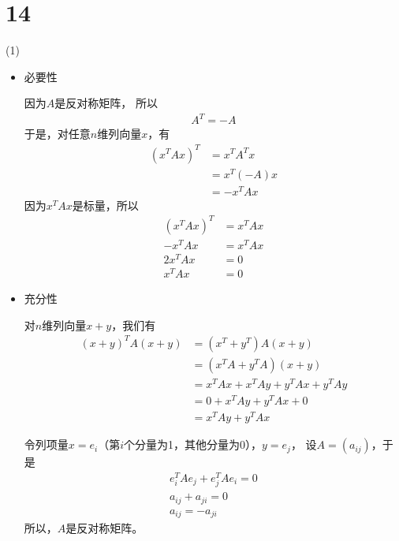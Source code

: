 \documentclass{article}
\begin{document}
\section*{14}

 (1)
\begin{itemize}
  \item 必要性

        因为$A$是反对称矩阵，
        所以
        \begin{align*}
          A^T = -A
        \end{align*}
        于是，对任意$n$维列向量$x$，有
        \begin{align*}
          (x^T A x)^T
           & = x^T A^T x  \\
           & = x^T (-A) x \\
           & = -x^T A x
        \end{align*}
        因为$x^T A x$是标量，所以
        \begin{align*}
          (x^T A x)^T & = x^T A x \\
          -x^T A x    & = x^T A x \\
          2 x^T A x   & = 0       \\
          x^T A x     & = 0
        \end{align*}

  \item 充分性

        对$n$维列向量$x + y$，我们有
        \begin{align*}
          (x + y)^T A (x + y)
           & = (x^T + y^T) A (x + y)                 \\
           & = (x^T A + y^T A)(x + y)                \\
           & = x^T A x + x^T A y + y^T A x + y^T A y \\
           & = 0 + x^T A y + y^T A x + 0             \\
           & = x^T A y + y^T A x
        \end{align*}

        令列项量$x = e_i$（第$i$个分量为1，其他分量为0），$y = e_j$，
        设$A = (a_{ij})$，于是
        \begin{align*}
          e_i^T A e_j + e_j^T A e_i = 0 \\
          a_{ij} + a_{ji} = 0           \\
          a_{ij} = -a_{ji}
        \end{align*}
        所以，$A$是反对称矩阵。

\end{itemize}
\end{document}
